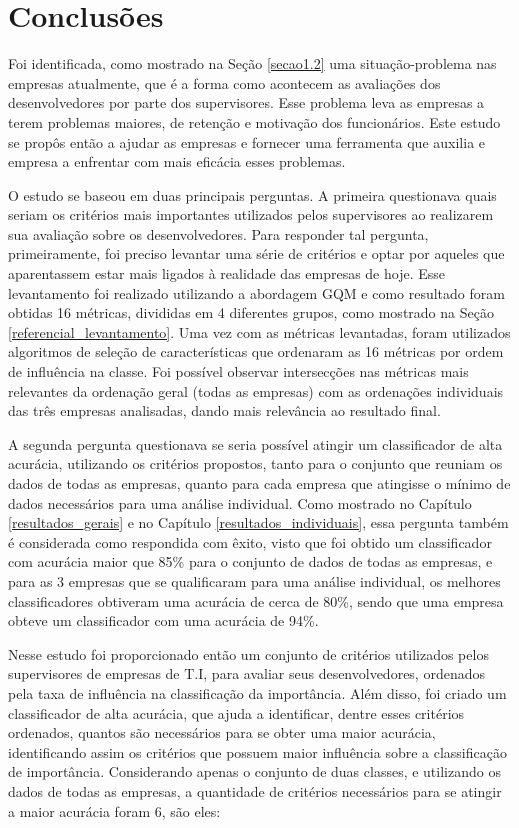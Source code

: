 \chapter[Conclusões]{Conclusões}

Foi identificada, como mostrado na Seção \ref{secao1.2} uma situação-problema nas empresas atualmente, que é a forma como acontecem as avaliações dos desenvolvedores por parte dos supervisores. Esse problema leva as empresas a terem problemas maiores, de retenção e motivação dos funcionários. Este estudo se propôs então a ajudar as empresas e fornecer uma ferramenta que auxilia e empresa a enfrentar com mais eficácia esses problemas.

O estudo se baseou em duas principais perguntas. A primeira questionava quais seriam os critérios mais importantes utilizados pelos supervisores ao realizarem sua avaliação sobre os desenvolvedores. Para responder tal pergunta, primeiramente, foi preciso levantar uma série de critérios e optar por aqueles que aparentassem estar mais ligados à realidade das empresas de hoje. Esse levantamento foi realizado utilizando a abordagem GQM e como resultado foram obtidas 16 métricas, divididas em 4 diferentes grupos, como mostrado na Seção \ref{referencial_levantamento}. Uma vez com as métricas levantadas, foram utilizados algoritmos de seleção de características que ordenaram as 16 métricas por ordem de influência na classe. Foi possível observar intersecções nas métricas mais relevantes da ordenação geral (todas as empresas) com as ordenações individuais das três empresas analisadas, dando mais relevância ao resultado final.

A segunda pergunta questionava se seria possível atingir um classificador de alta acurácia, utilizando os critérios propostos, tanto para o conjunto que reuniam os dados de todas as empresas, quanto para cada empresa que atingisse o mínimo de dados necessários para uma análise individual. Como mostrado no Capítulo \ref{resultados_gerais} e no Capítulo \ref{resultados_individuais}, essa pergunta também é considerada como respondida com êxito, visto que foi obtido um classificador com acurácia maior que 85\% para o conjunto de dados de todas as empresas, e para as 3 empresas que se qualificaram para uma análise individual, os melhores classificadores obtiveram uma acurácia de cerca de 80\%, sendo que uma empresa obteve um classificador com uma acurácia de 94\%.

Nesse estudo foi proporcionado então um conjunto de critérios utilizados pelos supervisores de empresas de T.I, para avaliar seus desenvolvedores, ordenados pela taxa de influência na classificação da importância. Além disso, foi criado um classificador de alta acurácia, que ajuda a identificar, dentre esses critérios ordenados, quantos são necessários para se obter uma maior acurácia, identificando assim os critérios que possuem maior influência sobre a classificação de importância. Considerando apenas o conjunto de duas classes, e utilizando os dados de todas as empresas, a quantidade de critérios necessários para se atingir a maior acurácia foram 6, são eles: 

